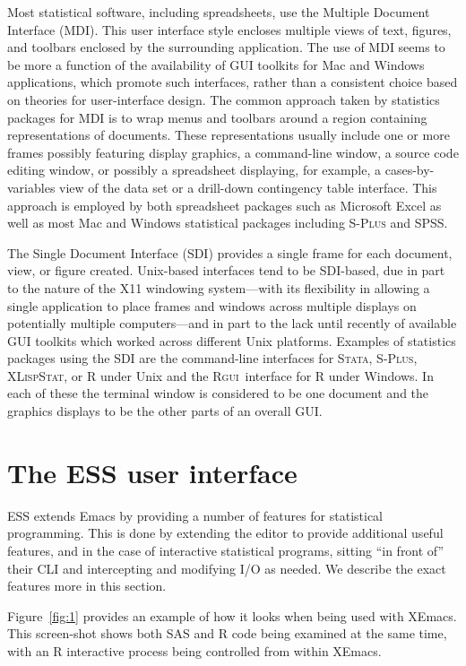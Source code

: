 \documentclass{article}
\newcommand*{\Splus}{\textsc{S-Plus}}
\newcommand*{\XLispStat}{\textsc{XLispStat}}
\newcommand*{\Stata}{\textsc{Stata}}
\newcommand*{\Rgui}{\textsc{Rgui}}
\begin{document}
Most statistical software, including spreadsheets, use the Multiple
Document Interface (MDI).  This user interface style encloses multiple
views of text, figures, and toolbars enclosed by the surrounding
application.  The use of MDI seems to be more a function of the
availability of GUI toolkits for Mac and Windows applications, which
promote such interfaces, rather than a consistent choice based on
theories for user-interface design.  The common approach taken by
statistics packages for MDI is to wrap menus and toolbars around a
region containing representations of documents.  These representations
usually include one or more frames possibly featuring display
graphics, a command-line window, a source code editing window, or
possibly a spreadsheet displaying, for example, a cases-by-variables
view of the data set or a drill-down contingency table interface.
This approach is employed by both spreadsheet packages such as
Microsoft Excel as well as most Mac and Windows statistical packages
including \Splus{} and SPSS.

The Single Document Interface (SDI) provides a single frame for each
document, view, or figure created.  Unix-based interfaces tend to be
SDI-based, due in part to the nature of the X11 windowing system---with its
flexibility in allowing a single application to place frames and
windows across multiple displays on potentially multiple computers---and
in part to the lack until recently of available GUI toolkits which
worked across different Unix platforms.  Examples of statistics
packages using the SDI are the command-line interfaces for \Stata,
\Splus, \XLispStat, or R under Unix and the \Rgui\ interface for R
under Windows.  In each of these the terminal window is considered to
be one document and the graphics displays to be the other parts of an
overall GUI.


\section{The ESS user interface}
\label{sec:ESS}

ESS extends Emacs by providing a number of features for statistical
programming.  This is done by extending the editor to provide
additional useful features, and in the case of interactive statistical
programs, sitting ``in front of'' their CLI and intercepting and
modifying I/O as needed.  We describe the exact features more in this
section.  

Figure~\ref{fig:1} provides an example of how it looks when being used
with XEmacs.  This screen-shot shows both SAS and R code being examined
at the same time, with an R interactive process being controlled from
within XEmacs.
\end{document}
